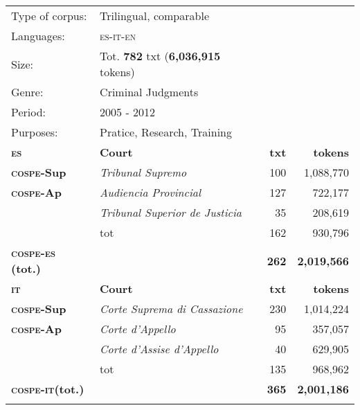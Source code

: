 \documentclass[output=paper]{LSP/langsci}
\begin{document}
\begin{table}
     \centering
     \begin{tabular}{llrr}
     \lsptoprule
Type of corpus: & Trilingual, comparable && \\
Languages: & \textsc{es}-\textsc{it}-\textsc{en} && \\
Size: & Tot. \textbf{782} txt (\textbf{6,036,915} tokens) && \\
Genre: & Criminal Judgments && \\
Period: & 2005 - 2012 && \\
Purposes: & Pratice, Research, Training   && \\
     \lsptoprule
       \textbf{\textsc{es}}  & \textbf{Court}       & \textbf{txt}  &  \textbf{tokens} \\ \midrule
       \textbf{\textsc{cospe}-\textsc{S}up}    & \textit{Tribunal Supremo}          & 100				& 1,088,770\\
       \textbf{\textsc{cospe}-\textsc{A}p}       & \textit{Audiencia Provincial}    & 127				& 722,177\\
                     & \textit{Tribunal Superior de Justicia}      & 35				& 208,619\\
                      & tot             & 162				& 930,796\\ \midrule
       \textbf{\textsc{cospe}-\textsc{es} (tot.)}    &              & \textbf{262}				& \textbf{2,019,566}\\ 

\lspbottomrule
       \textbf{\textsc{it}}  & \textbf{Court}       & \textbf{txt}  & \textbf{tokens} \\ \midrule
       \textbf{\textsc{cospe}-\textsc{S}up}    & \textit{Corte Suprema di Cassazione}             & 230				& 1,014,224\\
       \textbf{\textsc{cospe}-\textsc{A}p}       & \textit{Corte d’Appello}             & 95				& 357,057\\
                     & \textit{Corte d’Assise d’Appello}             & 40				& 629,905\\
                      & tot             & 135				& 968,962\\ \hline
       \textbf{\textsc{cospe}-\textsc{it}(tot.)}   &    &     \textbf{365}				& \textbf{2,001,186}\\  
\lspbottomrule


\end{tabular}
\end{table}
\end{document}
